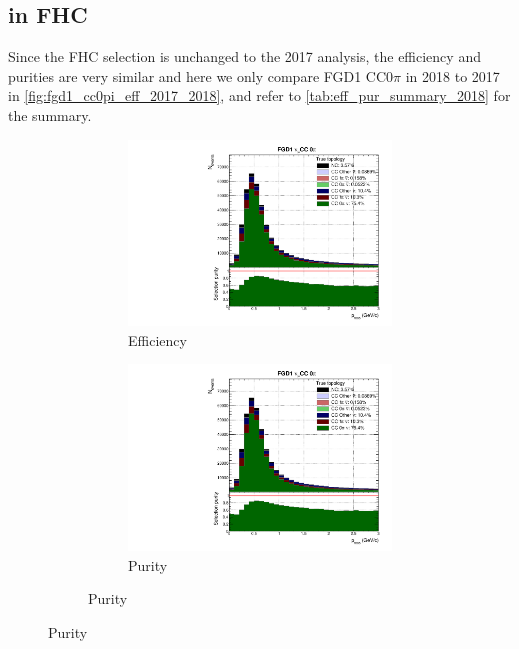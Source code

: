 \subsection{\numu in FHC}
Since the FHC selection is unchanged to the 2017 analysis, the efficiency and purities are very similar and here we only compare FGD1 CC0$\pi$ in 2018 to 2017 in \autoref{fig:fgd1_cc0pi_eff_2017_2018}, and refer to \autoref{tab:eff_pur_summary_2018} for the summary.
\begin{figure}[h]
	\centering
	\caption*{2018 analysis}
	\begin{subfigure}[t]{\textwidth}
		\centering
	\begin{subfigure}[t]{0.4\textwidth}
		\includegraphics[width=\textwidth,page=1, trim={0mm 0mm 0mm 9mm}, clip]{figures/mach3/2018/Selection/2018_RedNDmatrix_rebin_verbose_may_noweights_diagnostics}
		\caption{Efficiency}
	\end{subfigure}
	\begin{subfigure}[t]{0.4\textwidth}
		\includegraphics[width=\textwidth,page=2, trim={0mm 0mm 0mm 9mm}, clip]{figures/mach3/2018/Selection/2018_RedNDmatrix_rebin_verbose_may_noweights_diagnostics}
		\caption{Purity}
	\end{subfigure}
\end{subfigure}


\end{figure}
